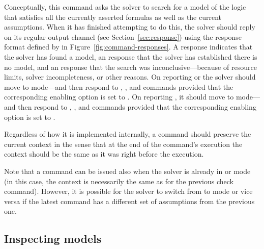 \begin{description}
Conceptually, this command asks the solver to search for a model of the logic 
that satisfies all the currently asserted formulas as well as 
the current assumptions.
When it has finished attempting to do this, the solver should reply 
on its regular output channel (see Section~\ref{sec:response}) using 
the response format defined by  
in Figure~\ref{fig:command-responses}.
A  response indicates that the solver has found a model,
an  response that the solver has established there is no model, and 
an  response that the search was inconclusive---because of 
resource limits, solver incompleteness, or other reasons.
%
On reporting  or  the solver should move 
to  mode---and then respond to , , and
 commands provided that the corresponding enabling option is set 
to .
On reporting , it should move to  mode---and then respond
to , , and 
 commands
provided that the corresponding enabling option is set to .

Regardless of how it is implemented internally, 
a  command should preserve the current context 
in the sense that at the end of the command's execution the context should be 
the same as it was right before the execution.

Note that a  command can be issued also 
when the solver is already in  or  mode
(in this case, the context is necessarily the same as for the previous check command).
However, it is possible for the solver to switch from  
to  mode or vice versa if the latest command has 
a different set of assumptions from the previous one.

\end{description}


\subsection{Inspecting models} 

